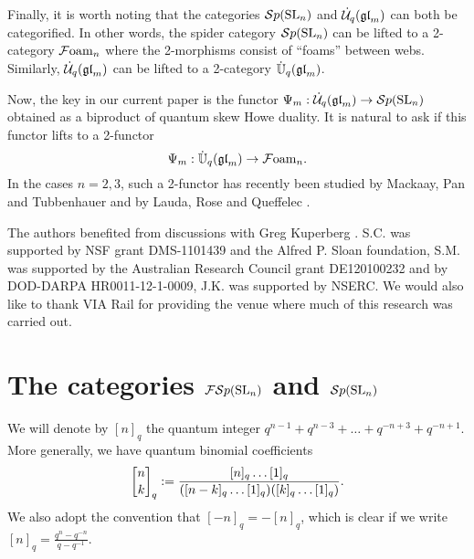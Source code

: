 \documentclass[11pt]{amsart}
\begin{document}
Finally, it is worth noting that the categories ${\mathcal{S}p}({\rm{SL}}_n)$ and $\dot{{\mathcal{U}}}_q({\mathfrak{gl}}_m)$ can both be categorified. In other words, the spider category ${\mathcal{S}p}({\rm{SL}}_n)$ can be lifted to a 2-category ${\mathcal{F}{\rm oam}}_n$ where the 2-morphisms consist of ``foams'' between webs. Similarly, $\dot{{\mathcal{U}}}_q({\mathfrak{gl}}_m)$ can be lifted to a 2-category $\dot{\mathbb{U}}_q({\mathfrak{gl}}_m)$. 

Now, the key in our current paper is the functor $\Psi_m: \dot{{\mathcal{U}}}_q({\mathfrak{gl}}_m) \rightarrow {\mathcal{S}p}({\rm{SL}}_n)$ obtained as a biproduct of quantum skew Howe duality. It is natural to ask if this functor lifts to a 2-functor
$$\Psi_m: \dot{\mathbb{U}}_q({\mathfrak{gl}}_m) \rightarrow {\mathcal{F}{\rm oam}}_n.$$
In the cases $n=2,3$, such a 2-functor has recently been studied by Mackaay, Pan and Tubbenhauer \cite{1206.2118} and by Lauda, Rose and Queffelec \cite{LRQ}. 

\vspace{.5cm}

The authors benefited from discussions with Greg Kuperberg . S.C. was supported by NSF grant DMS-1101439 and the Alfred P. Sloan foundation, S.M. was supported by the Australian Research Council grant DE120100232 and by DOD-DARPA HR0011-12-1-0009, J.K. was supported by NSERC.  We would also like to thank VIA Rail for providing the venue where much of this research was carried out. 

\section{The categories \texorpdfstring{${\mathcal{FS}p}({\rm{SL}}_n)$}{FSp(SL\_n)} and \texorpdfstring{${\mathcal{S}p}({\rm{SL}}_n)$}{Sp(SL\_n)}}\label{sec:diagrams}

We will denote by $[n]_q$ the quantum integer $q^{n-1} + q^{n-3} + \dots + q^{-n+3} + q^{-n+1}$. More generally, we have quantum binomial coefficients
$$\qBinomial{n}{k} := \frac{[n]_q\dots[1]_q}{([n-k]_q \dots [1]_q)([k]_q \dots [1]_q)}.$$
We also adopt the convention that $[-n]_q = -[n]_q$, which is clear if we write $[n]_q = \frac{q^{n} - q^{-n}}{q-q^{-1}}$. 
\end{document}
